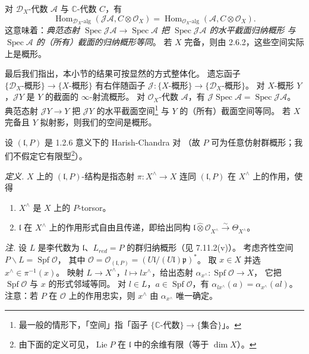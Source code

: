 对 $\mathcal{D}_X$-代数 $\mathcal{A}$ 与 $\mathbb{C}$-代数 $C$，有
\[
\operatorname{Hom}_{\mathcal{D}_X\text{-alg}}(\mathcal{J}\mathcal{A},C\otimes\mathcal{O}_X)
=\operatorname{Hom}_{\mathcal{O}_X\text{-alg}}(\mathcal{A},C\otimes\mathcal{O}_X).
\]
这意味着：\emph{典范态射 $\operatorname{Spec}\mathcal{J}\mathcal{A}\to\operatorname{Spec}\mathcal{A}$
把 $\operatorname{Spec}\mathcal{J}\mathcal{A}$ 的水平截面归纳概形
与 $\operatorname{Spec}\mathcal{A}$ 的（所有）截面的归纳概形等同}。
若 $X$ 完备，则由 2.6.2，这些空间实际上是概形。

最后我们指出，本小节的结果可按显然的方式整体化。
遗忘函子 $\{\mathcal{D}_X\text{-概形}\}\to\{X\text{-概形}\}$ 有右伴随函子
$\mathcal{J}: \{X\text{-概形}\}\to\{\mathcal{D}_X\text{-概形}\}$。
对 $X$-概形 $Y$，$\mathcal{J}Y$ 是 $Y$ 的截面的 $\infty$-射流概形。
对 $\mathcal{O}_X$-代数 $\mathcal{A}$，有 $\mathcal{J}\operatorname{Spec}\mathcal{A}=\operatorname{Spec}\mathcal{J}\mathcal{A}$。
典范态射 $\mathcal{J}Y\to Y$ 把 $\mathcal{J}Y$ 的水平截面空间\footnote{最一般的情形下，「空间」指「函子 $\{\mathbb{C}\text{-代数}\}\to\{\text{集合}\}$」。}
与 $Y$ 的（所有）截面空间等同。
若 $X$ 完备且 $Y$ 拟射影，则我们的空间是概形。

 设 $(\mathfrak{l},P)$ 是 1.2.6 意义下的 Harish-Chandra 对
（故 $P$ 可为任意仿射群概形；我们不假定它有限型\footnote{由下面的定义可见，$\operatorname{Lie} P$ 在 $\mathfrak{l}$ 中的余维有限（等于 $\dim X$）。}）。

\emph{定义.} $X$ 上的 $(\mathfrak{l},P)$-结构是指态射 $\pi: X^{\wedge}\to X$
连同 $(\mathfrak{l},P)$ 在 $X^{\wedge}$ 上的作用，使得
\begin{enumerate}[label=(\roman*),leftmargin=2.2em]
\item $X^{\wedge}$ 是 $X$ 上的 $P$-torsor。
\item $\mathfrak{l}$ 在 $X^{\wedge}$ 上的作用形式自由且传递，即给出同构
  $\mathfrak{l}\hat{\otimes}\mathcal{O}_{X^{\wedge}}\overset{\sim}{\to}\Theta_{X^{\wedge}}$。
\end{enumerate}

\emph{注.} 设 $L$ 是李代数为 $\mathfrak{l}$、$L_{red}=P$ 的群归纳概形（见 7.11.2(v)）。
考虑齐性空间 $P\backslash L=\operatorname{Spf}\mathcal{O}$，
其中 $\mathcal{O}=\mathcal{O}_{(\mathfrak{l},P)}=(U\mathfrak{l}/(U\mathfrak{l})\mathfrak{p})^*$。
取 $x\in X$ 并选 $x^{\wedge}\in\pi^{-1}(x)$。
映射 $L\to X^{\wedge}$，$l\mapsto lx^{\wedge}$，给出态射
$\alpha_{x^{\wedge}}: \operatorname{Spf}\mathcal{O}\to X$，
它把 $\operatorname{Spf}\mathcal{O}$ 与 $x$ 的形式邻域等同。
对 $l\in L$，$a\in\operatorname{Spf}\mathcal{O}$，有 $\alpha_{lx^{\wedge}}(a)=\alpha_{x^{\wedge}}(al)$。
注意：若 $P$ 在 $\mathcal{O}$ 上的作用忠实，则 $x^{\wedge}$ 由 $\alpha_{x^{\wedge}}$ 唯一确定。

